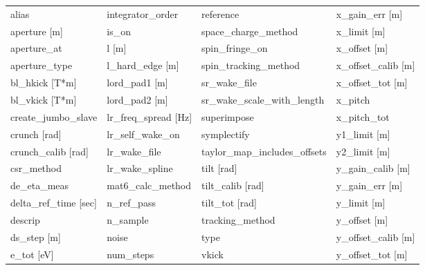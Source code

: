  \begin{tabular}{llll} \toprule
alias                          & integrator_order               & reference                      & x_gain_err [m]                 \\
aperture [m]                   & is_on                          & space_charge_method            & x_limit [m]                    \\
aperture_at                    & l [m]                          & spin_fringe_on                 & x_offset [m]                   \\
aperture_type                  & l_hard_edge [m]                & spin_tracking_method           & x_offset_calib [m]             \\
bl_hkick [T*m]                 & lord_pad1 [m]                  & sr_wake_file                   & x_offset_tot [m]               \\
bl_vkick [T*m]                 & lord_pad2 [m]                  & sr_wake_scale_with_length      & x_pitch                        \\
create_jumbo_slave             & lr_freq_spread [Hz]            & superimpose                    & x_pitch_tot                    \\
crunch [rad]                   & lr_self_wake_on                & symplectify                    & y1_limit [m]                   \\
crunch_calib [rad]             & lr_wake_file                   & taylor_map_includes_offsets    & y2_limit [m]                   \\
csr_method                     & lr_wake_spline                 & tilt [rad]                     & y_gain_calib [m]               \\
de_eta_meas                    & mat6_calc_method               & tilt_calib [rad]               & y_gain_err [m]                 \\
delta_ref_time [sec]           & n_ref_pass                     & tilt_tot [rad]                 & y_limit [m]                    \\
descrip                        & n_sample                       & tracking_method                & y_offset [m]                   \\
ds_step [m]                    & noise                          & type                           & y_offset_calib [m]             \\
e_tot [eV]                     & num_steps                      & vkick                          & y_offset_tot [m]               \\

\end{tabular}
